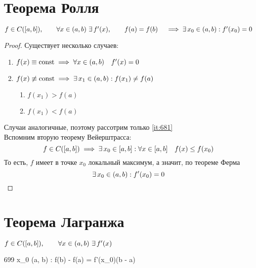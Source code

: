 \section{Теорема Ролля}

\begin{theorem}
	$f \in C([a, b]), \qquad \forall x \in (a, b) ~ \exists\, f'(x), \qquad f(a) = f(b) \quad \implies \exists\, x_0 \in (a, b) : f'(x_0) = 0 $
\end{theorem}

\begin{proof}
	Существует несколько случаев:
	\begin{enumerate}
		\item $f(x) \equiv \operatorname{const} \implies \forall x \in (a, b) \quad f'(x) = 0$
		\item $f(x) \not\equiv \operatorname{const} \implies \exists\, x_1 \in (a, b) : f(x_1) \ne f(a) $
		\begin{enumerate}
			\item $f(x_1) > f(a)$
			\item \label{it:681} $f(x_1) < f(a)$
		\end{enumerate}
	\end{enumerate}
	Случаи аналогичные, поэтому рассотрим только \ref{it:681} \\
	Вспомним вторую теорему Вейерштрасса:
	$$ f \in C([a, b]) \implies \exists\, x_0 \in [a, b] : \forall x \in [a, b] \quad f(x) \le f(x_0) $$
	То есть, $f$ имеет в точке $x_0$ локальный максимум, а значит, по теореме Ферма
	$$ \exists\, x_0 \in (a, b) : f'(x_0) = 0 $$
\end{proof}

\section{Теорема Лагранжа}

\begin{theorem}
	$f \in C([a, b]), \qquad \forall x \in (a, b) ~ \exists\, f'(x) $
	\begin{equ}{699}
		\implies \exist x_0 \in (a, b) : f(b) - f(a) = f'(x_0)(b - a)
	\end{equ}
\end{theorem}

